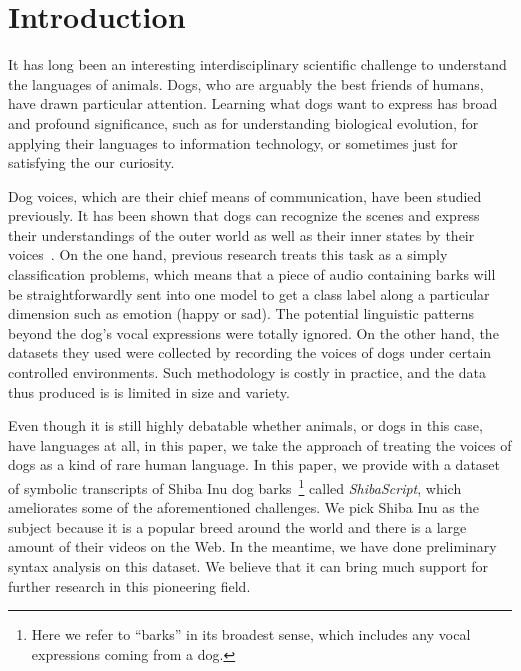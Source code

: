\section{Introduction}
\label{sec:intro}

It has long been an interesting interdisciplinary scientific challenge to 
understand the languages of animals. Dogs, who are arguably the best friends
of humans, have drawn particular attention. Learning what dogs want to 
express has broad and profound significance, such as for understanding 
biological evolution\cite{pongracz2017modeling}, for applying their languages 
to information technology, or sometimes just for satisfying the
our curiosity.

Dog voices, which are their chief means of communication, have been
studied previously. It has been shown that dogs can recognize the scenes 
and express their understandings of the outer world as well as their 
inner states by their voices~\cite{molnar2008classification, hantke2018my}. 
On the one hand, previous research treats this task as a simply 
classification problems, which means that a piece of audio containing barks 
will be straightforwardly sent into one model to get a class label along a
particular dimension such as emotion (happy or sad). 
The potential linguistic patterns beyond the dog's vocal expressions 
were totally ignored. 
On the other hand, the datasets they used were collected 
by recording the voices of dogs under certain controlled environments.
Such methodology is costly in practice, and the data thus produced is
is limited in size and variety. 



Even though it is still highly debatable whether animals, or dogs in this
case, have languages at all, in this paper, we take the approach of treating
the voices of dogs as a kind of rare human language. 
In this paper, we provide with a dataset of symbolic transcripts of Shiba Inu 
dog barks~\footnote{Here we refer to ``barks'' in its broadest sense, which
includes any vocal expressions coming from a dog.} called \textit{ShibaScript}, 
which ameliorates some of the aforementioned challenges. 
We pick Shiba Inu as the subject because it is a popular breed around the world
and there is a large amount of their videos on the Web. 
In the meantime, we have done preliminary syntax analysis on this dataset. 
We believe that it can bring much support for further research in 
this pioneering field.

